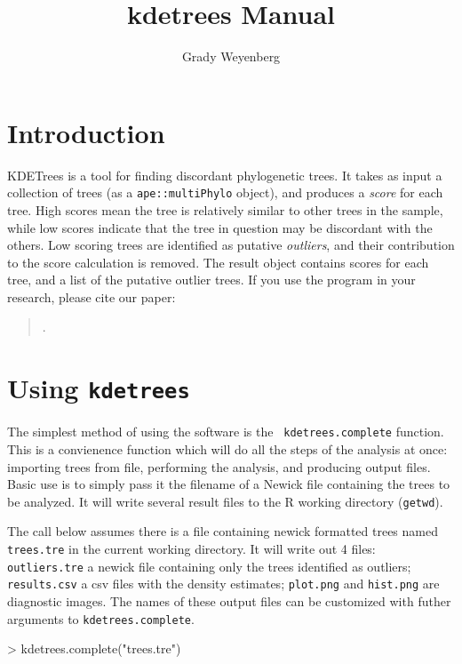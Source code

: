 \documentclass{article}
\title{kdetrees Manual}
\author{Grady Weyenberg}
\begin{document}
\maketitle

\section{Introduction}
\label{sec:introduction}

KDETrees is a tool for finding discordant phylogenetic trees. It takes
as input a collection of trees (as a {\tt ape::multiPhylo} object),
and produces a \emph{score} for each tree. High scores mean the tree
is relatively similar to other trees in the sample, while low scores
indicate that the tree in question may be discordant with the
others. Low scoring trees are identified as putative \emph{outliers},
and their contribution to the score calculation is removed. The result
object contains scores for each tree, and a list of the putative
outlier trees. If you use the program in your research, please cite
our paper:
\begin{quote}
  .
\end{quote}


\section{Using {\tt kdetrees}}
\label{sec:use}
The simplest method of using the software is the {\tt
  kdetrees.complete} function. This is a convienence function which
will do all the steps of the analysis at once: importing trees from
file, performing the analysis, and producing output files. Basic use
is to simply pass it the filename of a Newick file containing the
trees to be analyzed. It will write several result files to the R
working directory ({\tt getwd}).

The call below assumes there is a file containing newick formatted trees
named {\tt trees.tre} in the current working directory. It will write
out 4 files: {\tt outliers.tre} a newick file containing only the
trees identified as outliers; {\tt results.csv} a csv files with the
density estimates; {\tt plot.png} and {\tt hist.png} are diagnostic
images. The names of these output files can be customized with futher
arguments to {\tt kdetrees.complete}.

\begin{Schunk}
\begin{Sinput}
> kdetrees.complete("trees.tre")
\end{Sinput}
\end{Schunk}
\end{document}
